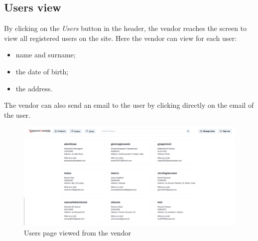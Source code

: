 \subsection{Users view}
By clicking on the \textit{Users} button in the header, the vendor reaches the screen to view all registered users on the site.
Here the vendor can view for each user:
\begin {itemize}
\item name and surname;
\item the date of birth;
\item the address.
\end {itemize}
The vendor can also send an email to the user by clicking directly on the email of the user.
\begin{figure}[!ht]
    \caption{Users page viewed from the vendor}
    \vspace{5px}
    \includegraphics[scale=0.25]{../../../../Images/userManual/usersVendor.png}
    \centering
\end{figure}